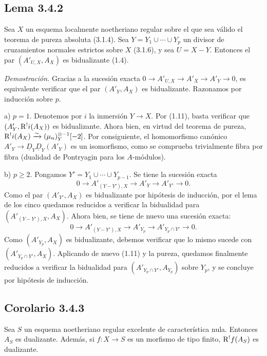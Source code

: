 \subsection*{Lema 3.4.2}
Sea $X$ un esquema localmente noetheriano regular sobre el que sea válido el teorema de pureza absoluta (3.1.4). Sea $Y = Y_1 \cup \cdots \cup Y_p$ un divisor de cruzamientos normales estrictos sobre $X$ (3.1.6), y sea $U = X - Y$. Entonces el par $(A'_{U,X}, A_X)$ es bidualizante (1.4).

\emph{Demostración.} Gracias a la sucesión exacta $0 \to A'_{U,X} \to A'_X \to A'_Y \to 0$, es equivalente verificar que el par $(A'_Y, A_X)$ es bidualizante. Razonamos por inducción sobre $p$.

a) $p = 1$. Denotemos por $i$ la inmersión $Y \to X$. Por (1.11), basta verificar que $(A'_Y, \mathrm{R}^{!}i(A_X))$ es bidualizante. Ahora bien, en virtud del teorema de pureza, $\mathrm{R}^{!}i(A_X) \xrightarrow{\sim} (\mu_n)^{\otimes -1}_Y[-2]$. Por consiguiente, el homomorfismo canónico $A'_Y \to \underline{D}_Y \underline{D}_Y(A'_Y)$ es un isomorfismo, como se comprueba trivialmente fibra por fibra (dualidad de Pontryagin para los $A$-módulos).

b) $p \geqslant 2$. Pongamos $Y' = Y_1 \cup \cdots \cup Y_{p-1}$. Se tiene la sucesión exacta
\[
0 \longrightarrow A'_{(Y-Y'),X} \longrightarrow A'_Y \longrightarrow A'_{Y'} \longrightarrow 0.
\]
Como el par $(A'_{Y'}, A_X)$ es bidualizante por hipótesis de inducción, por el lema de los cinco quedamos reducidos a verificar la bidualidad para $(A'_{(Y-Y'),X}, A_X)$. Ahora bien, se tiene de nuevo una sucesión exacta:
\[
0 \longrightarrow A'_{(Y-Y'),X} \longrightarrow A'_{Y_p} \longrightarrow A'_{Y_p \cap Y'} \longrightarrow 0.
\]
Como $(A'_{Y_p}, A_X)$ es bidualizante, debemos verificar que lo mismo sucede con $(A'_{Y_p \cap Y'}, A_X)$. Aplicando de nuevo (1.11) y la pureza, quedamos finalmente reducidos a verificar la bidualidad para $(A'_{Y_p \cap Y'}, A_{Y_p})$ sobre $Y_p$, y se concluye por hipótesis de inducción.

\subsection*{Corolario 3.4.3}
Sea $S$ un esquema noetheriano regular excelente de característica nula. Entonces $A_S$ es dualizante. Además, si $f : X \to S$ es un morfismo de tipo finito, $\mathrm{R}^{!}f(A_S)$ es dualizante.

